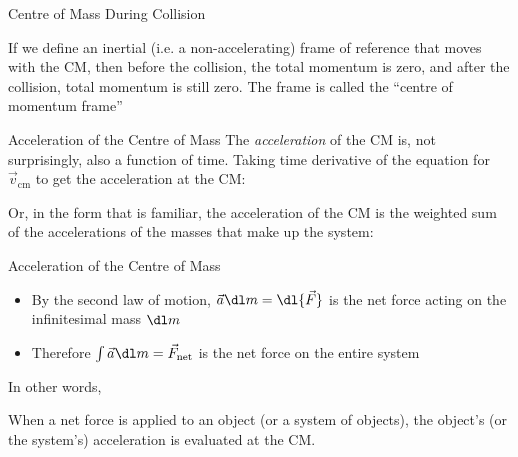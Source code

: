 \documentclass[12pt,compress,aspectratio=169]{beamer}
\begin{document}
\begin{frame}{Centre of Mass During Collision}
\begin{center}
  \end{center}
  If we define an inertial (i.e. a non-accelerating) frame of reference that
  moves with the CM, then before the collision, the total momentum is
  zero, and after the collision, total momentum is still zero. The frame is
  called the ``centre of momentum frame''
\end{frame}



\begin{frame}{Acceleration of the Centre of Mass}
  The \emph{acceleration} of the CM is, not surprisingly, also a function of
  time. Taking time derivative of the equation for $\vec v_\text{cm}$ to get the
  acceleration at the CM:


  Or, in the form that is familiar, the acceleration of the CM is the weighted
  sum of the accelerations of the masses that make up the system:
  
\end{frame}



\begin{frame}{Acceleration of the Centre of Mass}
  
  \begin{itemize}
  \item By the second law of motion, $\vec a\dl m=\dl{\vec F}$ is the net force
    acting on the infinitesimal mass $\dl m$
  \item Therefore $\int\vec a\dl m=\vec F_\text{net}$ is the net force on the
    entire system
  \end{itemize}
  In other words,
  
  
  \vspace{-.1in}When a net force is applied to an object (or a system of
  objects), the object's (or the system's) acceleration is evaluated at the CM.
\end{frame}
\end{document}
